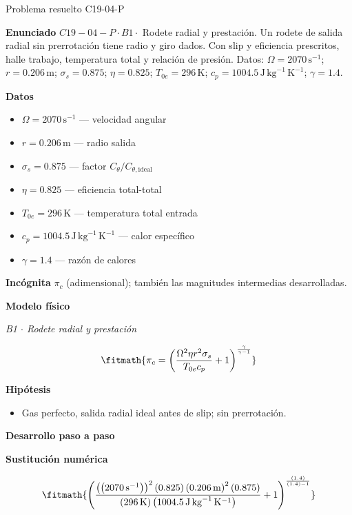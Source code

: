 \documentclass[10pt,openany]{book}
\begin{document}
\begin{studiumworked}{Problema resuelto C19-04-P}


\noindent\textbf{Enunciado}
\(C19-04-P \cdot B1 \cdot\) Rodete radial y prestación. Un rodete de salida radial sin prerrotación tiene radio y giro dados. Con slip y eficiencia prescritos, halle trabajo, temperatura total y relación de presión. Datos: \(\Omega=2070\, \mathrm{s}^{-1}\); \(r=0.206\, \mathrm{m}\); \(\sigma_s=0.875\); \(\eta=0.825\); \(T_{0e}=296\, \mathrm{K}\); \(c_p=1004.5\, \mathrm{J}\,\mathrm{kg}^{-1}\,\mathrm{K}^{-1}\); \(\gamma=1.4\).

\noindent\textbf{Datos}
\begin{itemize}
\item $\Omega = 2070\,\mathrm{s}^{-1}$ — velocidad angular
\item $r = 0.206\,\mathrm{m}$ — radio salida
\item $\sigma_s = 0.875$ — factor $C_\theta/C_{\theta,\mathrm{ideal}}$
\item $\eta = 0.825$ — eficiencia total-total
\item $T_{0e} = 296\,\mathrm{K}$ — temperatura total entrada
\item $c_p = 1004.5\,\mathrm{J}\,\mathrm{kg}^{-1}\,\mathrm{K}^{-1}$ — calor específico
\item $\gamma = 1.4$ — razón de calores
\end{itemize}

\noindent\textbf{Incógnita}
$\pi_c$ (adimensional); también las magnitudes intermedias desarrolladas.

\noindent\textbf{Modelo físico}

\noindent\textit{B1 \(\cdot\) Rodete radial y prestación}

\[
\fitmath{\pi_c=\left(\frac{\Omega^{2} \eta r^{2} \sigma_s}{T_{0e} c_p} + 1\right)^{\frac{\gamma}{\gamma - 1}}}
\]

\noindent\textbf{Hipótesis}
\begin{itemize}
\item Gas perfecto, salida radial ideal antes de slip; sin prerrotación.
\end{itemize}

\noindent\textbf{Desarrollo paso a paso}



\noindent\textbf{Sustitución numérica}

\[
\fitmath{\left(\frac{\left(\left(2070\,\mathrm{s}^{-1}\right)\right)^{2} \left(0.825\right) \left(0.206\,\mathrm{m}\right)^{2} \left(0.875\right)}{\left(296\,\mathrm{K}\right) \left(1004.5\,\mathrm{J}\,\mathrm{kg}^{-1}\,\mathrm{K}^{-1}\right)} + 1\right)^{\frac{\left(1.4\right)}{\left(1.4\right) - 1}}}
\]


\end{studiumworked}
\end{document}
